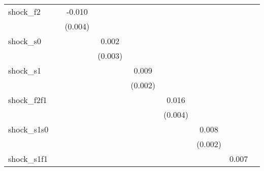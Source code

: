 {\begin{tabular}{l*{8}{c}}
\addlinespace
shock\_f2    &                     &      -0.010\sym{**} &                     &                     &                     &                     &                     &                     \\
            &                     &     (0.004)         &                     &                     &                     &                     &                     &                     \\
\addlinespace
shock\_s0    &                     &                     &       0.002         &                     &                     &                     &                     &                     \\
            &                     &                     &     (0.003)         &                     &                     &                     &                     &                     \\
\addlinespace
shock\_s1    &                     &                     &                     &       0.009\sym{***}&                     &                     &                     &                     \\
            &                     &                     &                     &     (0.002)         &                     &                     &                     &                     \\
\addlinespace
shock\_f2f1  &                     &                     &                     &                     &       0.016\sym{***}&                     &                     &                     \\
            &                     &                     &                     &                     &     (0.004)         &                     &                     &                     \\
\addlinespace
shock\_s1s0  &                     &                     &                     &                     &                     &       0.008\sym{***}&                     &                     \\
            &                     &                     &                     &                     &                     &     (0.002)         &                     &                     \\
\addlinespace
shock\_s1f1  &                     &                     &                     &                     &                     &                     &       0.007         &                     \\

\end{tabular}}
